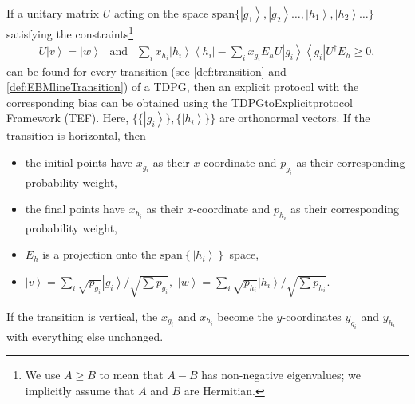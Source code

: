 \documentclass{theoretics}
\begin{document}
\begin{theorem}
  \begin{sloppy}If a unitary matrix $U$ acting on the space $\text{span}\{\left|g_{1}\right\rangle ,\left|g_{2}\right\rangle \dots,\left|h_{1}\right\rangle ,\left|h_{2}\right\rangle \dots\}$
    satisfying the constraints\footnote{We use $A\ge B$ to mean that $A-B$ has non-negative
      eigenvalues; we implicitly assume that $A$ and $B$ are Hermitian.}
    \begin{align}
      U\left|v\right\rangle =\left|w\right\rangle \ \ \text{ and }\ \
      \sum_{i}x_{h_{i}}\left|h_{i}\right\rangle \left\langle h_{i}\right|-\sum_{i}x_{g_{i}}E_{h}U\left|g_{i}\right\rangle \left\langle g_{i}\right|U^{\dagger}E_{h}\ge0,\label{eq:constraint}
    \end{align}
    can be found for every transition (see \cref{def:transition} and \cref{def:EBMlineTransition})
    of a TDPG, then an explicit protocol with the corresponding bias can
    be obtained using the TDPG\textendash to\textendash Explicit\textendash protocol
    Framework (TEF). Here, $\{\{\left|g_{i}\right\rangle \},\{\left|h_{i}\right\rangle \}\}$
    are orthonormal vectors. If the transition is horizontal, then
    \begin{itemize}
      \item the initial points have $x_{g_{i}}$ as their $x$-coordinate and
            $p_{g_{i}}$ as their corresponding probability weight,
      \item the final points have $x_{h_{i}}$ as their $x$-coordinate
            and $p_{h_{i}}$ as their corresponding probability weight,
      \item $E_{h}$ is a projection onto the $\text{span}\left\{ \left|h_{i}\right\rangle \right\} $
            space,
      \item $\left|v\right\rangle =\sum_{i}\sqrt{p_{g_{i}}}\left|g_{i}\right\rangle /\sqrt{\sum p_{g_{i}}},$
            $\left|w\right\rangle =\sum_{i}\sqrt{p_{h_{i}}}\left|h_{i}\right\rangle /\sqrt{\sum p_{h_{i}}}$.
    \end{itemize}
    If the transition is vertical, the $x_{g_{i}}$ and $x_{h_{i}}$
    become the $y$-coordinates $y_{g_{i}}$ and $y_{h_{i}}$ with everything
    else unchanged.\label{thm:TEFconstraint-inf}\end{sloppy}
\end{theorem}
\end{document}
